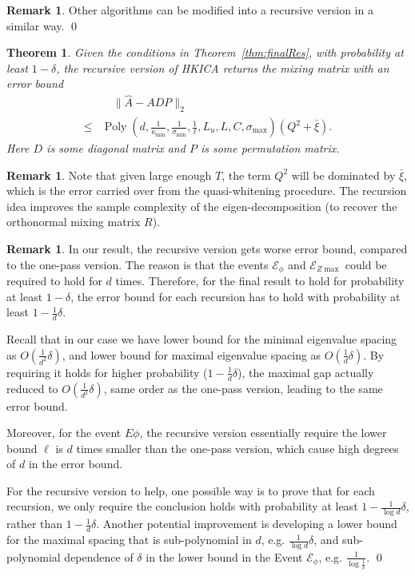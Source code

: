 \documentclass[jmlr]{article}
\newcommand{\Ephi}{\mathcal{E}_{\phi}}
\newcommand{\Ez}{\mathcal{E}_{Z\max}}
\DeclareMathOperator{\pol}{Poly}
\newcommand{\poly}[1]{\pol\left(#1\right)}
\newtheorem{thm}[lemma]{Theorem}
\theoremstyle{definition}
\newtheorem{remark}[lemma]{Remark}
\begin{document}
\begin{remark}
Other algorithms can be modified into a recursive version in a similar way. 
\qed
\end{remark}
\begin{thm}
\label{thm:recursiveAlg}
Given the conditions in Theorem~\ref{thm:finalRes}, with probability at least $1-\delta$, the recursive version of HKICA returns the mixing matrix with an error bound
\begin{align*}
& \quad \| \hat{A} - ADP\|_2 \\
\le & \poly{d,\frac{1}{\kappa_{\min}}, \frac{1}{\sigma_{\min}}, \frac{1}{\ell}, L_u, L, C, \sigma_{\max}}(Q^2 + \bar{\xi}).
\end{align*}
Here $D$ is some diagonal matrix and $P$ is some permutation matrix.
\end{thm} 
\begin{remark}
Note that given large enough $T$, the term $Q^2$ will be dominated by $\bar{\xi}$, which is the error carried over from the quasi-whitening procedure.
The recursion idea improves the sample complexity of the eigen-decomposition (to recover the orthonormal mixing matrix $R$).  
\end{remark}

\begin{remark}
In our result, the recursive version gets worse error bound, compared to the one-pass version. The reason is that the events $\Ephi$ and $\Ez$ could be required to hold for $d$ times. Therefore, for the final result to hold for probability at least $1-\delta$, the error bound for each recursion has to hold with probability at least $1-\frac{1}{d}\delta$. 

Recall that in our case we have lower bound for the minimal eigenvalue spacing as $O(\frac{1}{d^2}\delta)$, and lower bound for maximal eigenvalue spacing as $O(\frac{1}{d}\delta)$. By requiring it holds for higher probability ($1-\frac{1}{d}\delta$), the maximal gap actually reduced to $O(\frac{1}{d^2}\delta)$, same order as the one-pass version, leading to the same error bound.

Moreover, for the event $E\phi$, the recursive version essentially require the lower bound $\ell$ is $d$ times smaller than the one-pass version, which cause high degrees of $d$ in the error bound.

For the recursive version to help, one possible way is to prove that for each recursion, we only require the conclusion holds with probability at least $1-\frac{1}{\log d}\delta$, rather than $1-\frac{1}{d}\delta$. 
Another potential improvement is developing a lower bound for the maximal spacing that is sub-polynomial in $d$, e.g. $\frac{1}{\log d}\delta$, and sub-polynomial dependence of $\delta$ in the lower bound in the Event $\Ephi$, e.g. $\frac{1}{\log \frac{1}{\delta}}$.    
\qed
\end{remark}
\fi
\end{document}
